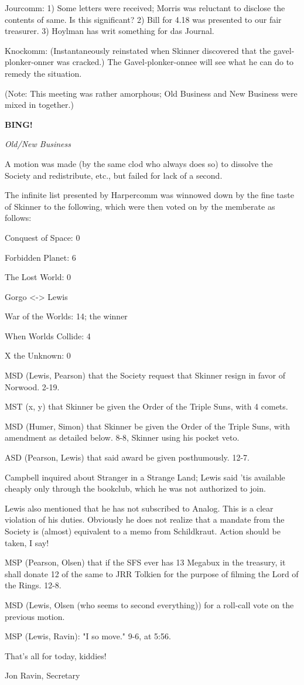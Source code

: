\documentclass[12pt]{article}
\newcommand{\bing}{{\bf BING!} }
\newcommand{\goto}[1]{\bing \vskip 12pt \centerline{{\em{#1}}}}
\begin{document}
Jourcomm: 1) Some letters were received; Morris was reluctant to disclose the contents of same. Is this significant? 2) Bill for 4.18 was presented to our fair treasurer. 3) Hoylman has writ something for das Journal.

Knockomm: (Instantaneously reinstated when Skinner discovered that the gavel-plonker-onner was cracked.) The Gavel-plonker-onnee will see what he can do to remedy the situation.

(Note: This meeting was rather amorphous; Old Business and New Business were mixed in together.)

\goto{Old/New Business}

A motion was made (by the same clod who always does so) to dissolve the Society and redistribute, etc., but failed for lack of a second.

The infinite list presented by Harpercomm was winnowed down by the fine taste of Skinner to the following, which were then voted on by the memberate as follows:

Conquest of Space: 0

Forbidden Planet: 6

The Lost World: 0

Gorgo <-> Lewis

War of the Worlds: 14; the winner

When Worlds Collide: 4

X the Unknown: 0

MSD (Lewis, Pearson) that the Society request that Skinner resign in favor of Norwood. 2-19.

MST (x, y) that Skinner be given the Order of the Triple Suns, with 4 comets.

MSD (Humer, Simon) that Skinner be given the Order of the Triple Suns, with amendment as detailed below. 8-8, Skinner using his pocket veto.

ASD (Pearson, Lewis) that said award be given posthumously. 12-7.

Campbell inquired about Stranger in a Strange Land; Lewis said 'tis available cheaply only through the bookclub, which he was not authorized to join.

Lewis also mentioned that he has not subscribed to Analog. This is a clear violation of his duties. Obviously he does not realize that a mandate from the Society is (almost) equivalent to a memo from Schildkraut. Action should be taken, I say!

MSP (Pearson, Olsen) that if the SFS ever has 13 Megabux in the treasury, it shall donate 12 of the same to JRR Tolkien for the purpose of filming the Lord of the Rings. 12-8.

MSD (Lewis, Olsen (who seems to second everything)) for a roll-call vote on the previous motion.

MSP (Lewis, Ravin): "I so move." 9-6, at 5:56.

\vspace{12pt}

\centerline{That's all for today, kiddies!}
\centerline{Jon Ravin, Secretary}
\end{document}
